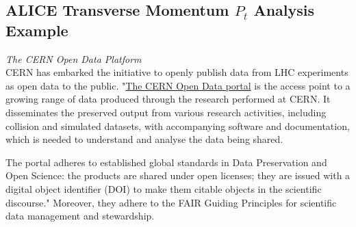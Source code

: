 \subsection{ALICE Transverse Momentum $P_t$ Analysis Example}
\vspace{-1em}
\textit{The CERN Open Data Platform}\\
CERN has embarked the initiative to openly publish data from LHC experiments as open data to the public.\cite{COD-announcement}
"\href{http://opendata.cern.ch/}{The CERN Open Data portal} is the access point to a growing range of data produced through the research performed at CERN. It disseminates the preserved output from various research activities, including collision and simulated datasets, with accompanying software and documentation, which is needed to understand and analyse the data being shared.

\justify
The portal adheres to established global standards in Data Preservation and Open Science: the products are shared under open licenses; they are issued with a digital object identifier (DOI) to make them citable objects in the scientific discourse."\cite{COD-about} Moreover, they adhere to the FAIR Guiding
Principles for scientific data
management and stewardship. \cite{FAIR-principles}


